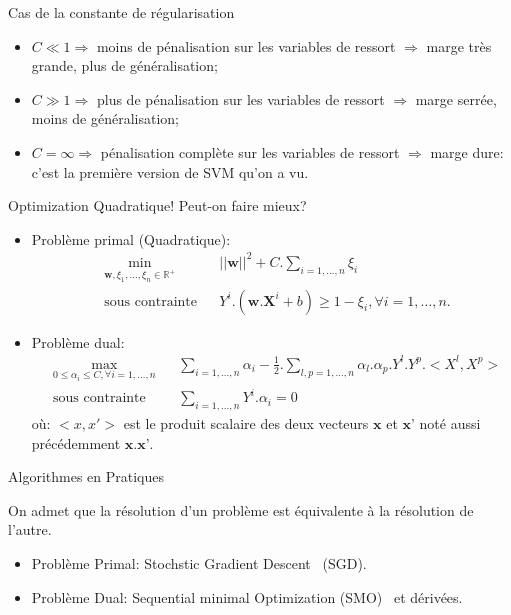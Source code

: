 \documentclass[8pt]{beamer}
\begin{document}
		\begin{frame}{Cas de la constante de régularisation}
			\begin{itemize}
				\item<1->  $C \ll 1 \Longrightarrow$ moins de pénalisation sur les variables de ressort $\Longrightarrow$ marge très grande, plus de généralisation;
				\item<2->  $C \gg 1 \Longrightarrow$ plus de pénalisation sur les variables de ressort $\Longrightarrow$ marge serrée, moins de généralisation;
				\item<3->  $C=\infty \Longrightarrow$ pénalisation complète sur les variables de ressort $\Longrightarrow$ marge dure: c'est la première version de SVM qu'on a vu.
			\end{itemize}
		\end{frame}
		\begin{frame}{Optimization Quadratique! Peut-on faire mieux?}
			\begin{itemize}
				\item<1->  Problème primal (Quadratique):
				\begin{equation}
					\begin{aligned}
					& \min_{\textbf{w}, \xi_1,\dots,\xi_n \in \mathbb{R}^+}
					& & {\vert\vert \textbf{w} \vert\vert}^2 + C.\sum_{i=1,\dots,n}\xi_i \\
					& \text{sous contrainte}
					& & Y^i.(\textbf{w}.\textbf{X}^i + b) \geq 1 - \xi_i , \forall i = 1, \dots, n.
					\end{aligned}
				\end{equation}
				\item<2->  Problème dual:
				\begin{equation}
					\begin{aligned}
					& \max_{0 \leq \alpha_i \leq C ,\forall i=1,\dots,n}
					& & \sum_{i=1,\dots,n} \alpha_i - \frac{1}{2}.\sum_{l,p=1,\dots,n}\alpha_l.\alpha_p.Y^l.Y^p.<X^l,X^p>\\
					& \text{sous contrainte}
					& & \sum_{i=1,\dots,n}Y^i.\alpha_i=0
					\end{aligned}
				\end{equation}
				où: $<x, x'>$ est le produit scalaire des deux vecteurs $\textbf{x}$ et $\textbf{x'}$ noté aussi précédemment $\textbf{x}.\textbf{x'}$.
			\end{itemize}
		\end{frame}
		\begin{frame}{Algorithmes en Pratiques}

			On admet que la résolution d'un problème est équivalente à la résolution de l'autre.
			\begin{itemize}
				\item  Problème Primal: Stochstic Gradient Descent~\cite{bottou2010} (SGD).
				\item  Problème Dual: Sequential minimal Optimization (SMO)~\cite{platt1998sequential} et dérivées.
			\end{itemize}
		\end{frame}
\end{document}
